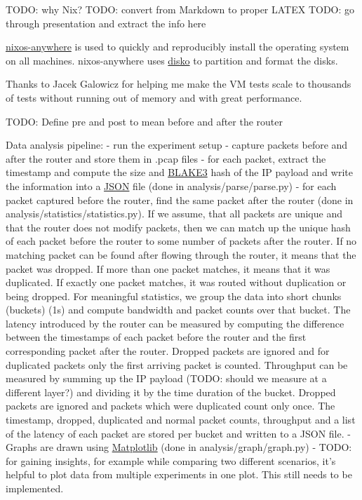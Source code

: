 TODO: why Nix?
TODO: convert from Markdown to proper LATEX
TODO: go through presentation and extract the info here

\href{https://github.com/nix-community/nixos-anywhere}{nixos-anywhere} is used to quickly and reproducibly install the operating system on all machines.
nixos-anywhere uses \href{https://github.com/nix-community/disko}{disko} to partition and format the disks.


Thanks to Jacek Galowicz for helping me make the VM tests scale to thousands of tests without running out of memory and with great performance.

TODO: Define pre and post to mean before and after the router

Data analysis pipeline:
- run the experiment setup
- capture packets before and after the router and store them in .pcap files
- for each packet, extract the timestamp and compute the size and \href{https://en.wikipedia.org/wiki/BLAKE_(hash_function)#BLAKE3}{BLAKE3} hash of the IP payload and write the information into a \href{https://en.wikipedia.org/wiki/JSON}{JSON} file (done in analysis/parse/parse.py)
- for each packet captured before the router, find the same packet after the router (done in analysis/statistics/statistics.py). If we assume, that all packets are unique and that the router does not modify packets, then we can match up the unique hash of each packet before the router to some number of packets after the router. If no matching packet can be found after flowing through the router, it means that the packet was dropped. If more than one packet matches, it means that it was duplicated. If exactly one packet matches, it was routed without duplication or being dropped. For meaningful statistics, we group the data into short chunks (buckets) (1s) and compute bandwidth and packet counts over that bucket. The latency introduced by the router can be measured by computing the difference between the timestamps of each packet before the router and the first corresponding packet after the router. Dropped packets are ignored and for duplicated packets only the first arriving packet is counted. Throughput can be measured by summing up the IP payload (TODO: should we measure at a different layer?) and dividing it by the time duration of the bucket. Dropped packets are ignored and packets which were duplicated count only once. The timestamp, dropped, duplicated and normal packet counts, throughput and a list of the latency of each packet are stored per bucket and written to a JSON file.
- Graphs are drawn using \href{https://matplotlib.org/}{Matplotlib} (done in analysis/graph/graph.py)
- TODO: for gaining insights, for example while comparing two different scenarios, it's helpful to plot data from multiple experiments in one plot. This still needs to be implemented.


